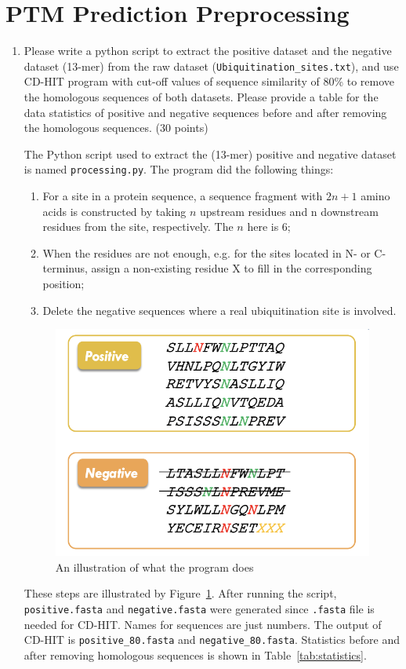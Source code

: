 \documentclass{article}
\begin{document}
\section{PTM Prediction Preprocessing}
\begin{enumerate}
    \item Please write a python script to extract the positive dataset and the negative dataset (13-mer) from the raw dataset (\texttt{Ubiquitination\_sites.txt}), and use CD-HIT program with cut-off values of sequence similarity of 80\% to remove the homologous sequences of both datasets. Please provide a table for the data statistics of positive and negative sequences before and after removing the homologous sequences. (30 points)
    
    The Python script used to extract the (13-mer) positive and negative dataset is named \texttt{processing.py}. The program did the following things:
    \begin{enumerate}
        \item For a site in a protein sequence, a sequence fragment with $2n + 1$ amino acids
        is constructed by taking $n$ upstream residues and n downstream residues from the site, respectively. The $n$ here is $6$;
        \item When the residues are not enough, e.g. for the sites located in N- or C-terminus,
        assign a non-existing residue X to fill in the corresponding position;
        \item Delete the negative sequences where a real ubiquitination site is involved.
    \end{enumerate}
    \begin{figure}[htbp]
        \centering
        \includegraphics[width=0.7\linewidth]{images/illustration.png}
        \caption{An illustration of what the program does}
        \label{fig:illustrate}
    \end{figure}
    These steps are illustrated by Figure~\ref{fig:illustrate}. After running the script, \texttt{positive.fasta} and \texttt{negative.fasta} were generated since \texttt{.fasta} file is needed for CD-HIT. Names for sequences are just numbers. The output of CD-HIT is \texttt{positive\_80.fasta} and \texttt{negative\_80.fasta}. Statistics before and after removing homologous sequences is shown in Table~\ref{tab:statistics}. 


\end{enumerate}
\end{document}
